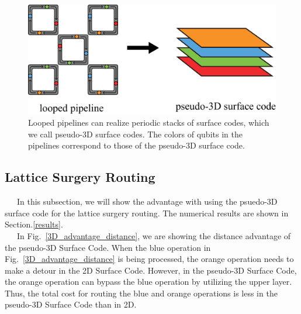 \documentclass[a4paper,11pt]{ltjsarticle}
\begin{document}
{{        \begin{figure}[h]
            \centering
            \includegraphics[scale=0.25]{figure/pipeline_to_surface.eps}
            \vspace{0pt}\caption{Looped pipelines can realize periodic stacks of surface codes, which we call pseudo-3D surface codes. The colors of qubits in the pipelines correspond to those of the pseudo-3D surface code.}
            \label{pipeline_to_surface}
            \vspace{-10pt}
        \end{figure}
        
    }

    \subsection{Lattice Surgery Routing}{
        \ \ \ In this subsection, we will show the advantage with using the psuedo-3D surface code for the lattice surgery routing. The numerical results are shown in Section.\ref{results}.\\
        \ \ \ In Fig.~\ref{3D_advantage_distance}, we are showing the distance advantage of the pseudo-3D Surface Code. When the blue operation in Fig.~\ref{3D_advantage_distance} is being processed, the orange operation needs to make a detour in the 2D Surface Code. However, in the pseudo-3D Surface Code, the orange operation can bypass the blue operation by utilizing the upper layer. Thus, the total cost for routing the blue and orange operations is less in the pseudo-3D Surface Code than in 2D.

}}
\end{document}
